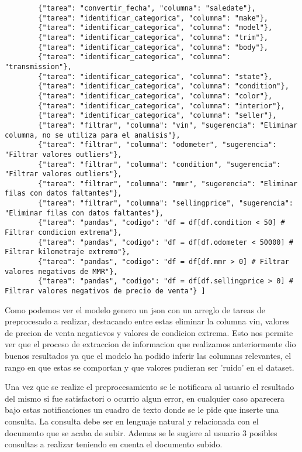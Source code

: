 \begin{lstlisting}
		{"tarea": "convertir_fecha", "columna": "saledate"}, 
		{"tarea": "identificar_categorica", "columna": "make"}, 
		{"tarea": "identificar_categorica", "columna": "model"}, 
		{"tarea": "identificar_categorica", "columna": "trim"}, 
		{"tarea": "identificar_categorica", "columna": "body"}, 
		{"tarea": "identificar_categorica", "columna": "transmission"}, 
		{"tarea": "identificar_categorica", "columna": "state"}, 
		{"tarea": "identificar_categorica", "columna": "condition"}, 
		{"tarea": "identificar_categorica", "columna": "color"}, 
		{"tarea": "identificar_categorica", "columna": "interior"}, 
		{"tarea": "identificar_categorica", "columna": "seller"}, 
		{"tarea": "filtrar", "columna": "vin", "sugerencia": "Eliminar columna, no se utiliza para el analisis"}, 
		{"tarea": "filtrar", "columna": "odometer", "sugerencia": "Filtrar valores outliers"}, 
		{"tarea": "filtrar", "columna": "condition", "sugerencia": "Filtrar valores outliers"}, 
		{"tarea": "filtrar", "columna": "mmr", "sugerencia": "Eliminar filas con datos faltantes"}, 
		{"tarea": "filtrar", "columna": "sellingprice", "sugerencia": "Eliminar filas con datos faltantes"}, 
		{"tarea": "pandas", "codigo": "df = df[df.condition < 50] # Filtrar condicion extrema"}, 
		{"tarea": "pandas", "codigo": "df = df[df.odometer < 50000] # Filtrar kilometraje extremo"}, 
		{"tarea": "pandas", "codigo": "df = df[df.mmr > 0] # Filtrar valores negativos de MMR"}, 
		{"tarea": "pandas", "codigo": "df = df[df.sellingprice > 0] # Filtrar valores negativos de precio de venta"} ]
\end{lstlisting}

Como podemos ver el modelo genero un json con un arreglo de tareas de preprocesado a realizar, destacando entre estas eliminar la columna vin, valores de precion de venta negaticvos y valores de condicion extrema. Esto nos permite ver que el proceso de extraccion de informacion que realizamos anteriormente dio buenos resultados ya que el modelo ha podido inferir las columnas relevantes, el rango en que estas se comportan y que valores pudieran ser 'ruido' en el dataset.

Una vez que se realize el preprocesamiento se le notificara al usuario el resultado del mismo si fue satisfactori o ocurrio algun error, en cualquier caso aparecera bajo estas notificaciones un cuadro de texto donde se le pide que inserte una consulta. La consulta debe ser en lenguaje natural y relacionada con el documento que se acaba de subir. Ademas se le sugiere al usuario 3 posibles consultas a realizar teniendo en cuenta el documento subido.

